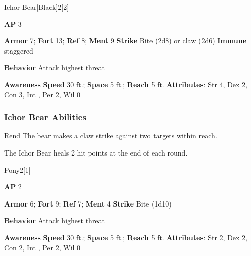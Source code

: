 \begin{monsection}{Ichor Bear}[Black]{2}[2]
\vspace{-1em}\vspace{-1em}
\begin{spellcontent}
\begin{spelltargetinginfo}
{\textbf{AP} 3}

\pari \textbf{Armor} 7;
\textbf{Fort} 13;
\textbf{Ref} 8;
\textbf{Ment} 9
\pari \textbf{Strike} Bite  (2d8) or claw  (2d6)
\pari \textbf{Immune} staggered


\pari \textbf{Behavior} Attack highest threat
\end{spelltargetinginfo}
\end{spellcontent}

\begin{monsterfooter}
\pari \textbf{Awareness} 
\pari \textbf{Speed} 30 ft.;
\textbf{Space} 5 ft.;
\textbf{Reach} 5 ft.
\pari \textbf{Attributes}:
Str 4,
Dex 2,
Con 3,
Int ,
Per 2,
Wil 0
\end{monsterfooter}
\end{monsection}


\subsubsection{Ichor Bear Abilities}

\begin{freeability}{Rend}
The bear makes a claw strike against two targets within reach.
\end{freeability}

The Ichor Bear heals 2 hit points at the end of each round.

\begin{monsection}{Pony}{2}[1]
\vspace{-1em}\vspace{-1em}
\begin{spellcontent}
\begin{spelltargetinginfo}
{\textbf{AP} 2}

\pari \textbf{Armor} 6;
\textbf{Fort} 9;
\textbf{Ref} 7;
\textbf{Ment} 4
\pari \textbf{Strike} Bite  (1d10)



\pari \textbf{Behavior} Attack highest threat
\end{spelltargetinginfo}
\end{spellcontent}

\begin{monsterfooter}
\pari \textbf{Awareness} 
\pari \textbf{Speed} 30 ft.;
\textbf{Space} 5 ft.;
\textbf{Reach} 5 ft.
\pari \textbf{Attributes}:
Str 2,
Dex 2,
Con 2,
Int ,
Per 2,
Wil 0
\end{monsterfooter}
\end{monsection}

